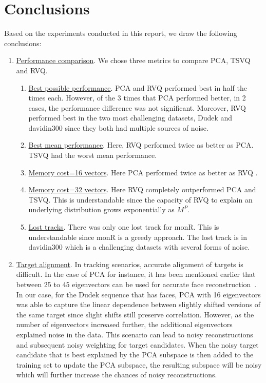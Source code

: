 \section{Conclusions}
Based on the experiments conducted in this report, we draw the following conclusions:

\begin{enumerate}
\item \underline{Performance comparison}.  We chose three metrics to compare PCA, TSVQ and RVQ.
\begin{enumerate}
\item \underline{Best possible performance}.  PCA and RVQ performed best in half the times each.  However, of the 3 times that PCA performed better, in 2 cases, the performance difference was not significant.  Moreover, RVQ performed best in the two most challenging datasets, Dudek and davidin300 since they both had multiple sources of noise.
\item \underline{Best mean performance}.  Here, RVQ performed twice as better as PCA.  TSVQ had the worst mean performance.
\item \underline{Memory cost=16 vectors}.  Here PCA performed twice as better as RVQ .
\item \underline{Memory cost=32 vectors}.  Here RVQ completely outperformed PCA and TSVQ.  This is understandable since the capacity of RVQ to explain an underlying distribution grows exponentially as $M^P$.
\item \underline{Lost tracks}.  There was only one lost track for monR.  This is understandable since monR is a greedy approach.  The lost track is in davidin300 which is a challenging datasets with several forms of noise.
\end{enumerate}

\item \underline{Target alignment}.  In tracking scenarios, accurate alignment of targets is difficult.  In the case of PCA for instance, it has been mentioned earlier that between 25 to 45 eigenvectors can be used for accurate face reconstruction~\cite{1997_JNL_EigenVsFisherFaces_Bel}.  In our case, for the Dudek sequence that has faces, PCA with 16 eigenvectors was able to capture the linear dependence between slightly shifted versions of the same target since slight shifts still preserve correlation.  However, as the number of eigenvectors increased further, the additional eigenvectors explained noise in the data.  This scenario can lead to noisy reconstructions and subsequent noisy weighting for target candidates.  When the noisy target candidate that is best explained by the PCA subspace is then added to the training set to update the PCA subspace, the resulting subspace will be noisy which will further increase the chances of noisy reconstructions.  
\end{enumerate}

